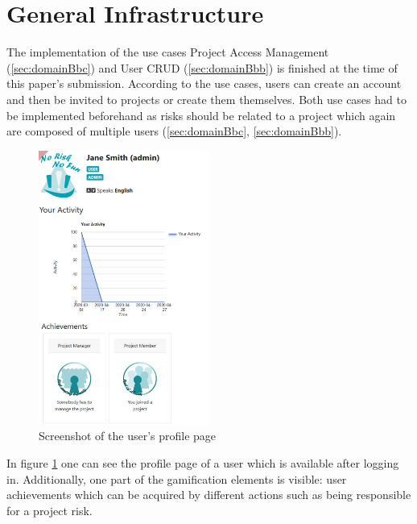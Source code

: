 \section{General Infrastructure}
\label{sec:implementationInfra}

The implementation of the use cases Project Access Management (\ref{sec:domainBbc}) and User CRUD (\ref{sec:domainBbb}) is finished at the time of this paper's submission. According to the use cases, users can create an account and then be invited to projects or create them themselves. Both use cases had to be implemented beforehand as risks should be related to a project which again are composed of multiple users (\ref{sec:domainBbc}, \ref{sec:domainBbb}).

\begin{figure}
	\includegraphics[width=0.5\textwidth]{Assets/implementation_shots/profile.png}
	\caption{Screenshot of the user's profile page}
	\label{fig:ShotProfile}
\end{figure}


In figure \ref{fig:ShotProfile} one can see the profile page of a user which is available after logging in. Additionally, one part of the gamification elements is visible: user achievements which can be acquired by different actions such as being responsible for a project risk.

